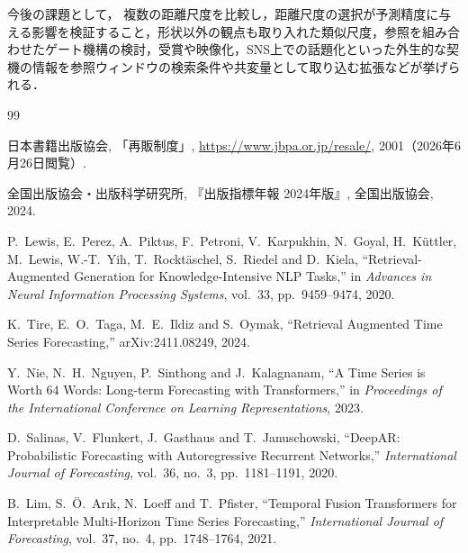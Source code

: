\documentclass[twocolumn, lastpage]{jarticle}
\newif\ifrevmark
\newcommand{\revA}[1]{\ifrevmark{\color{blue}#1}\else#1\fi}
\begin{document}
今後の課題として，%
\revA{複数の距離尺度を比較し，距離尺度の選択が予測精度に与える影響を検証すること，}形状以外の観点も取り入れた類似尺度，参照を組み合わせたゲート機構の検討\revA{，受賞や映像化，SNS上での話題化といった外生的な契機の情報を参照ウィンドウの検索条件や共変量として取り込む拡張}などが挙げられる．




\begin{thebibliography}{99}

日本書籍出版協会,
「再販制度」,
\url{https://www.jbpa.or.jp/resale/}, 2001（2026年6月26日閲覧）.

全国出版協会・出版科学研究所,
『出版指標年報 2024年版』,
全国出版協会, 2024.

P.~Lewis, E.~Perez, A.~Piktus, F.~Petroni, V.~Karpukhin, N.~Goyal, H.~K\"{u}ttler, M.~Lewis, W.-T.~Yih, T.~Rockt\"{a}schel, S.~Riedel and D.~Kiela,
``Retrieval-Augmented Generation for Knowledge-Intensive {NLP} Tasks,''
in \textit{Advances in Neural Information Processing Systems}, vol.~33, pp.~9459--9474, 2020.

K.~Tire, E.~O.~Taga, M.~E.~Ildiz and S.~Oymak,
``Retrieval Augmented Time Series Forecasting,''
arXiv:2411.08249, 2024.

Y.~Nie, N.~H.~Nguyen, P.~Sinthong and J.~Kalagnanam,
``A Time Series is Worth 64 Words: Long-term Forecasting with Transformers,''
in \textit{Proceedings of the International Conference on Learning Representations}, 2023.

D.~Salinas, V.~Flunkert, J.~Gasthaus and T.~Januschowski,
``{DeepAR}: Probabilistic Forecasting with Autoregressive Recurrent Networks,''
\textit{International Journal of Forecasting}, vol.~36, no.~3, pp.~1181--1191, 2020.

B.~Lim, S.~\"{O}.~Ar{\i}k, N.~Loeff and T.~Pfister,
``Temporal Fusion Transformers for Interpretable Multi-Horizon Time Series Forecasting,''
\textit{International Journal of Forecasting}, vol.~37, no.~4, pp.~1748--1764, 2021.


\end{thebibliography}
\end{document}
